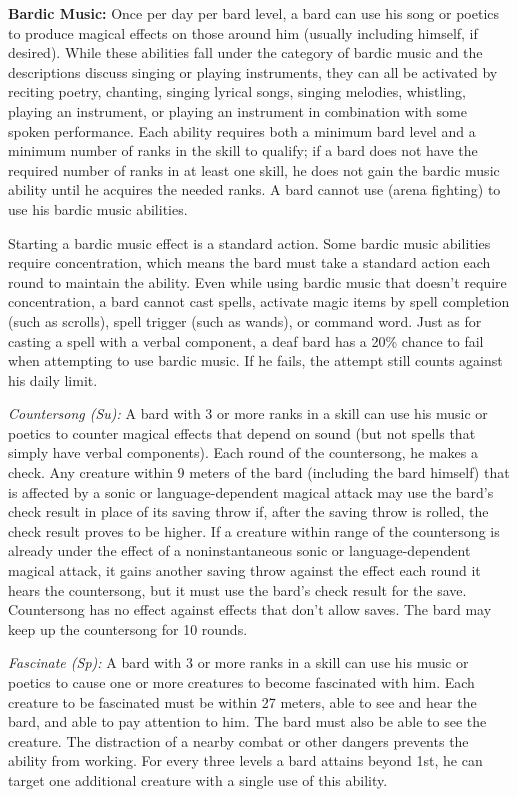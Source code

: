 \textbf{Bardic Music:} Once per day per bard level, a bard can use his song or poetics to produce magical effects on those around him (usually including himself, if desired). While these abilities fall under the category of bardic music and the descriptions discuss singing or playing instruments, they can all be activated by reciting poetry, chanting, singing lyrical songs, singing melodies, whistling, playing an instrument, or playing an instrument in combination with some spoken performance. Each ability requires both a minimum bard level and a minimum number of ranks in the  skill to qualify; if a bard does not have the required number of ranks in at least one  skill, he does not gain the bardic music ability until he acquires the needed ranks. A bard cannot use  (arena fighting) to use his bardic music abilities.

Starting a bardic music effect is a standard action. Some bardic music abilities require concentration, which means the bard must take a standard action each round to maintain the ability. Even while using bardic music that doesn't require concentration, a bard cannot cast spells, activate magic items by spell completion (such as scrolls), spell trigger (such as wands), or command word. Just as for casting a spell with a verbal component, a deaf bard has a 20\% chance to fail when attempting to use bardic music. If he fails, the attempt still counts against his daily limit.

\textit{Countersong (Su):} A bard with 3 or more ranks in a  skill can use his music or poetics to counter magical effects that depend on sound (but not spells that simply have verbal components). Each round of the countersong, he makes a  check. Any creature within 9 meters of the bard (including the bard himself) that is affected by a sonic or language-dependent magical attack may use the bard's  check result in place of its saving throw if, after the saving throw is rolled, the  check result proves to be higher. If a creature within range of the countersong is already under the effect of a noninstantaneous sonic or language-dependent magical attack, it gains another saving throw against the effect each round it hears the countersong, but it must use the bard's  check result for the save. Countersong has no effect against effects that don't allow saves. The bard may keep up the countersong for 10 rounds.

\textit{Fascinate (Sp):} A bard with 3 or more ranks in a  skill can use his music or poetics to cause one or more creatures to become fascinated with him. Each creature to be fascinated must be within 27 meters, able to see and hear the bard, and able to pay attention to him. The bard must also be able to see the creature. The distraction of a nearby combat or other dangers prevents the ability from working. For every three levels a bard attains beyond 1st, he can target one additional creature with a single use of this ability.

